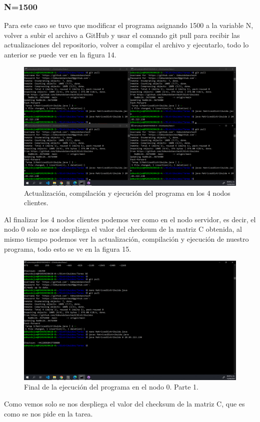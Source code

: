 \documentclass[11pt]{article}
\begin{document}
		\subsubsection{N=1500}
		Para este caso se tuvo que modificar el programa asignando 1500 a la variable N, volver a subir el archivo a GitHub y usar el comando git pull para recibir las actualizaciones del repositorio, volver a compilar el archivo y ejecutarlo, todo lo anterior se puede ver en la figura 14.
		\begin{figure}[H]
			\centering
			\includegraphics[scale=0.34]{resources/ejecucionnodo1a4n1500.png}
			\caption{Actualización, compilación y ejecución del programa en los 4 nodos clientes. }\label{fig:picture}
		\end{figure}
		Al finalizar los 4 nodos clientes podemos ver como en el nodo servidor, es decir, el nodo 0 solo se nos despliega el valor del checksum de la matriz C obtenida, al mismo tiempo podemos ver la actualización, compilación y ejecución de nuestro programa, todo esto se ve en la figura 15.
		\begin{figure}[H]
			\centering
			\includegraphics[scale=0.34]{resources/nodo0finaln1500.png}
			\caption{Final de la ejecución del programa en el nodo 0. Parte 1.}\label{fig:picture}
		\end{figure}
		Como vemos solo se nos despliega el valor del checksum de la matriz C, que es como se nos pide en la tarea.
\end{document}
